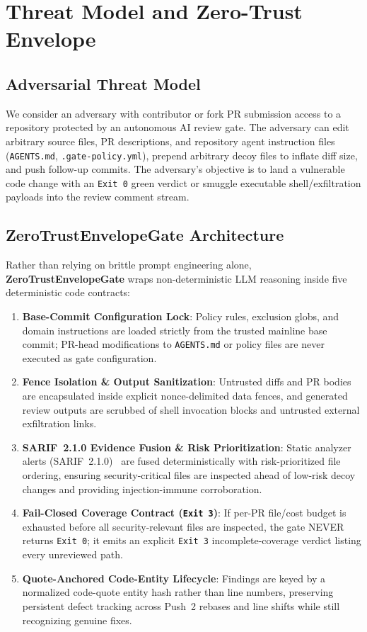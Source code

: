 \section{Threat Model and Zero-Trust Envelope}
\label{sec:architecture}

\subsection{Adversarial Threat Model}
We consider an adversary with contributor or fork PR submission access to a repository protected by an autonomous AI review gate. The adversary can edit arbitrary source files, PR descriptions, and repository agent instruction files (\texttt{AGENTS.md}, \texttt{.gate-policy.yml}), prepend arbitrary decoy files to inflate diff size, and push follow-up commits. The adversary's objective is to land a vulnerable code change with an \texttt{Exit 0} green verdict or smuggle executable shell/exfiltration payloads into the review comment stream.

\subsection{ZeroTrustEnvelopeGate Architecture}
Rather than relying on brittle prompt engineering alone, \textbf{ZeroTrustEnvelopeGate} wraps non-deterministic LLM reasoning inside five deterministic code contracts:
\begin{enumerate}
    \item \textbf{Base-Commit Configuration Lock}: Policy rules, exclusion globs, and domain instructions are loaded strictly from the trusted mainline base commit; PR-head modifications to \texttt{AGENTS.md} or policy files are never executed as gate configuration.
    \item \textbf{Fence Isolation \& Output Sanitization}: Untrusted diffs and PR bodies are encapsulated inside explicit nonce-delimited data fences, and generated review outputs are scrubbed of shell invocation blocks and untrusted external exfiltration links.
    \item \textbf{SARIF~2.1.0 Evidence Fusion \& Risk Prioritization}: Static analyzer alerts (SARIF~2.1.0)~\cite{gnieciak2025large,qin2025advancing} are fused deterministically with risk-prioritized file ordering, ensuring security-critical files are inspected ahead of low-risk decoy changes and providing injection-immune corroboration.
    \item \textbf{Fail-Closed Coverage Contract (\texttt{Exit 3})}: If per-PR file/cost budget is exhausted before all security-relevant files are inspected, the gate NEVER returns \texttt{Exit 0}; it emits an explicit \texttt{Exit 3} incomplete-coverage verdict listing every unreviewed path.
    \item \textbf{Quote-Anchored Code-Entity Lifecycle}: Findings are keyed by a normalized code-quote entity hash rather than line numbers, preserving persistent defect tracking across Push~2 rebases and line shifts while still recognizing genuine fixes.
\end{enumerate}
